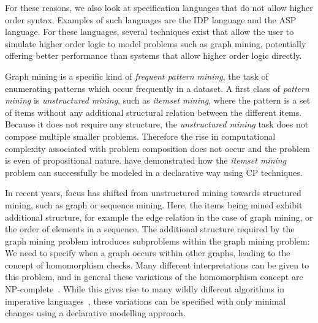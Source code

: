 For these reasons, we also look at specification languages that do not allow higher order syntax.
Examples of such languages are the IDP language and the ASP language.
For these languages, several techniques exist that allow the user to simulate higher order logic to model problems such as graph mining, potentially offering better performance than systems that allow higher order logic directly.


Graph mining is a specific kind of \emph{frequent pattern mining}, 
the task of enumerating patterns which occur frequently in a dataset.
A first class of \emph{pattern mining} is \emph{unstructured mining}, such as \emph{itemset mining}, where the pattern is a set of items without any additional structural relation between the different items. 
Because it does not require any structure, the \emph{unstructured mining} task does not compose multiple smaller problems.
Therefore the rise in computational complexity associated with problem composition does not occur and the problem is even of propositional nature.
\citet{tias_original} have demonstrated how the \emph{itemset mining} problem can successfully be modeled in a declarative way using CP techniques.

In recent years, focus has shifted from unstructured mining towards structured mining, such as graph or sequence mining.
Here, the items being mined exhibit additional structure, for example the edge relation in the case of graph mining, or the order of elements in a sequence.
The additional structure required by the graph mining problem introduces subproblems within the graph mining problem: We need to specify when a graph occurs within other graphs, leading to the concept of homomorphism checks.
Many different interpretations can be given to 
this problem\citep{subtree_overview}, and in general these variations of the homomorphism 
concept
are NP-complete~\citep{}.
While this gives rise to many wildly different algorithms in imperative languages~\citep{gspan,theta_subsumption}, these variations can be specified with only minimal changes using a declarative modelling approach.

